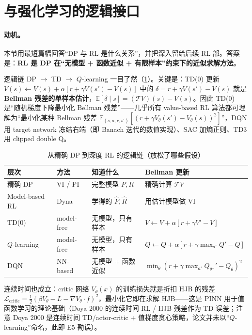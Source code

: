 \section{与强化学习的逻辑接口}
\label{sec:dp-rl-bridge}

\paragraph{动机。}
本节用最短篇幅回答“DP 与 RL 是什么关系”，并把深入留给后续 RL 部。答案是：\textbf{RL 是 DP 在“无模型 + 函数近似 + 有限样本”约束下的近似求解方法}。

逻辑链 DP $\to$ TD $\to$ $Q$-learning 一目了然（\cref{tab:dp-rl-chain}）。关键是：TD(0) 更新 $V(s)\leftarrow V(s)+\alpha[r+\gamma V(s')-V(s)]$ 中的 $\delta=r+\gamma V(s')-V(s)$ 就是\textbf{Bellman 残差的单样本估计}，$\mathbb E[\delta\mid s]=(\mathcal TV)(s)-V(s)$。因此 TD(0) 是“随机梯度下降最小化 Bellman 残差”——几乎所有 value-based RL 算法都可理解为“最小化某种 Bellman 残差 $\mathbb E_{(s,a,r,s')}[(r+\gamma V_\theta(s')-V_\theta(s))^2]$”，DQN 用 target network 冻结右端（即 Banach 迭代的数值实现）、SAC 加熵正则、TD3 用 clipped double Q。

\begin{table}[H]\centering\small
\caption{从精确 DP 到深度 RL 的逻辑链（放松了哪些假设）}
\label{tab:dp-rl-chain}
\begin{tabular}{llll}
\toprule
层次 & 方法 & 知道什么 & Bellman 更新 \\
\midrule
精确 DP & VI / PI & 完整模型 $P,R$ & 精确计算 $\mathcal TV$ \\
Model-based RL & Dyna & 学得的 $\hat P,\hat R$ & 用估计模型做 VI \\
TD(0) & model-free & 无模型，只有样本 & $V\leftarrow V+\alpha[r+\gamma V'-V]$ \\
$Q$-learning & model-free & 无模型，只有样本 & $Q\leftarrow Q+\alpha[r+\gamma\max_{a'}Q'-Q]$ \\
DQN & NN-based & 无模型 + 函数近似 & $\min_\theta(r+\gamma\max_{a'}Q_{\theta^-}'-Q_\theta)^2$ \\
\bottomrule
\end{tabular}
\end{table}

连续时间也成立：critic 网络 $V_\theta(x)$ 的训练损失就是折扣 HJB 的残差 $\mathcal L_{\mathrm{critic}}=\tfrac12(\beta V_\theta-L-\nabla V_\theta\cdot f)^2$，最小化它即在求解 HJB——这是 PINN 用于值函数学习的理论基础（Doya 2000\cite{doya2000continuous} 的连续时间 RL / HJB 残差作为 TD 误差；注意 Doya 2000 是连续时间 TD/actor-critic + 值梯度贪心策略，论文并未以“$Q$-learning”命名，此即 E5 勘误）。

